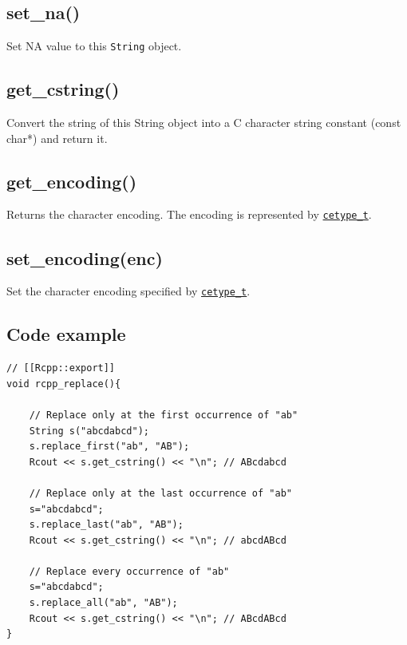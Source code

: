 \documentclass[
]{book}
\begin{document}
\hypertarget{set_na}{%
\subsection{set\_na()}\label{set_na}}

Set NA value to this \texttt{String} object.

\hypertarget{get_cstring}{%
\subsection{get\_cstring()}\label{get_cstring}}

Convert the string of this String object into a C character string constant (const char*) and return it.

\hypertarget{get_encoding}{%
\subsection{get\_encoding()}\label{get_encoding}}

Returns the character encoding. The encoding is represented by \href{https://github.com/wch/r-source/blob/bf0a0a9d12f2ce5d66673dc32cd253524f3270bf/src/include/Rinternals.h\#L928-L935}{\texttt{cetype\_t}}.

\hypertarget{set_encodingenc}{%
\subsection{set\_encoding(enc)}\label{set_encodingenc}}

Set the character encoding specified by \href{https://github.com/wch/r-source/blob/bf0a0a9d12f2ce5d66673dc32cd253524f3270bf/src/include/Rinternals.h\#L928-L935}{\texttt{cetype\_t}}.

\hypertarget{code-example}{%
\subsection{Code example}\label{code-example}}

\begin{verbatim}
// [[Rcpp::export]]
void rcpp_replace(){

    // Replace only at the first occurrence of "ab"
    String s("abcdabcd");
    s.replace_first("ab", "AB");
    Rcout << s.get_cstring() << "\n"; // ABcdabcd

    // Replace only at the last occurrence of "ab"
    s="abcdabcd";
    s.replace_last("ab", "AB");
    Rcout << s.get_cstring() << "\n"; // abcdABcd

    // Replace every occurrence of "ab"
    s="abcdabcd";
    s.replace_all("ab", "AB");
    Rcout << s.get_cstring() << "\n"; // ABcdABcd
}
\end{verbatim}
\end{document}
